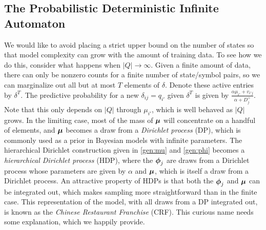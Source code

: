  \subsection{The Probabilistic Deterministic Infinite Automaton}
 
We would like to avoid placing a strict upper bound on the number of states so that model complexity can grow with the amount of training data.  To see how we do this, consider what happens when $|Q|\rightarrow\infty$.  Given a finite amount of data, there can only be nonzero counts for a finite number of state/symbol pairs, so we can marginalize out all but at most $T$ elements of $\delta$.  Denote these active entries by $\delta^T$.  The predictive probability for a new $\delta_{ij} = q_{i'}$ given $\delta^T$ is given by $\frac{\alpha\mu_{i'} + v_{i'j}}{\alpha + D^+_j}$.  Note that this only depends on $|Q|$ through $\mu_{i'}$, which is well behaved as $|Q|$ grows.  In the limiting case, most of the mass of $\bmu$ will concentrate on a handful of elements, and $\bmu$ becomes a draw from a {\em Dirichlet process} (DP), which is commonly used as a prior in Bayesian models with infinite parameters.  The hierarchical Dirichlet construction given in \eqref{gen:mu} and \eqref{gen:phi} becomes a {\em hierarchical Dirichlet process} (HDP), where the $\bphi_j$ are draws from a Dirichlet process whose parameters are given by $\alpha$ and $\bmu$, which is itself a draw from a Dirichlet process.  An attractive property of HDPs is that both the $\bphi_j$ and $\bmu$ can be integrated out, which makes sampling more straightforward than in the finite case.  This  representation of the model, with all draws from a DP integrated out, is known as the {\em Chinese Restaurant Franchise} (CRF).  This curious name needs some explanation, which we happily provide.
 
